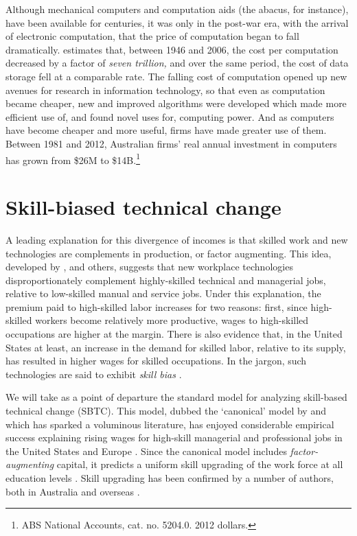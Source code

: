 Although mechanical computers and computation aids (the abacus, for instance), have been available for centuries, it was only in the post-war era, with the arrival of electronic computation, that the price of computation began to fall dramatically. \citet{Nordhaus2007} estimates that, between 1946 and 2006, the cost per computation decreased by a factor of {\em seven trillion,} and over the same period, the cost of data storage fell at a comparable rate. The falling cost of computation opened up new avenues for research in information technology, so that even as computation became cheaper, new and improved algorithms were developed which made more efficient use of, and found novel uses for, computing power. And as computers have become cheaper and more useful, firms have made greater use of them. Between 1981 and 2012, Australian firms' real annual investment in computers has grown from \$26M to \$14B.\footnote{ABS National Accounts, cat. no. 5204.0. 2012 dollars.}

\section{Skill-biased technical change}

A leading explanation for this divergence of incomes is that skilled work and new technologies are complements in production, or factor augmenting. This idea, developed by \citet{Tinbergen1974}, \citet{Katz1992} and others, suggests that new workplace technologies disproportionately complement highly-skilled technical and managerial jobs, relative to low-skilled manual and service jobs. Under this explanation, the premium paid to high-skilled labor increases for two reasons: first, since high-skilled workers become relatively more productive, wages to high-skilled occupations are higher at the margin. There is also evidence that, in the United States at least, an increase in the demand for skilled labor, relative to its supply, has resulted in higher wages for skilled occupations. In the jargon, such technologies are said to exhibit \emph{skill bias} \citep{Autor2006}.

We will take as a point of departure the standard model for analyzing skill-based technical change (SBTC). This model, dubbed the `canonical' model by \citet{Acemoglu2011} and which has sparked a voluminous literature, has enjoyed considerable empirical success explaining rising wages for high-skill managerial and professional jobs in the United States and Europe \citep{Katz1992}. Since the canonical model includes \emph{factor-augmenting} capital, it predicts a uniform skill upgrading of the work force at all education levels \citep{Levy2003}. Skill upgrading has been confirmed by a number of authors, both in Australia \citep{Esposto2012, Wooden2000, Cully1999} and overseas \citep{Autor2008}. 

